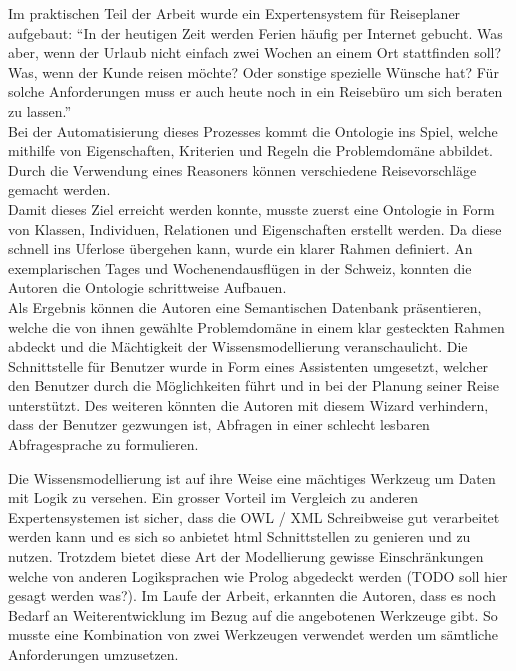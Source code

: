 Im praktischen Teil der Arbeit wurde ein Expertensystem für Reiseplaner aufgebaut: "`In der heutigen Zeit werden Ferien häufig per Internet gebucht. Was aber, wenn der Urlaub nicht einfach zwei Wochen an einem Ort stattfinden soll? Was, wenn der Kunde reisen möchte? Oder sonstige spezielle Wünsche hat? Für solche Anforderungen muss er auch heute noch in ein Reisebüro um sich beraten zu lassen."'\\
Bei der Automatisierung dieses Prozesses kommt die Ontologie ins Spiel, welche mithilfe von Eigenschaften, Kriterien und Regeln die Problemdomäne abbildet. Durch die Verwendung eines Reasoners können verschiedene Reisevorschläge gemacht werden.\\
Damit dieses Ziel erreicht werden konnte, musste zuerst eine Ontologie in Form von Klassen, Individuen, Relationen und Eigenschaften erstellt werden. Da diese schnell ins Uferlose übergehen kann, wurde ein klarer Rahmen definiert. An exemplarischen Tages und Wochenendausflügen in der Schweiz, konnten die Autoren die Ontologie schrittweise Aufbauen. \\
Als Ergebnis können die Autoren eine Semantischen Datenbank präsentieren, welche die von ihnen gewählte Problemdomäne in einem klar gesteckten Rahmen abdeckt und die Mächtigkeit der Wissensmodellierung veranschaulicht. Die Schnittstelle für Benutzer wurde in Form eines Assistenten umgesetzt, welcher den Benutzer durch die Möglichkeiten führt und in bei der Planung seiner Reise unterstützt. Des weiteren könnten die Autoren mit diesem Wizard verhindern, dass der Benutzer gezwungen ist, Abfragen in einer schlecht lesbaren Abfragesprache zu formulieren. 

Die Wissensmodellierung ist auf ihre Weise eine mächtiges Werkzeug um Daten mit Logik zu versehen. Ein grosser Vorteil im Vergleich zu anderen Expertensystemen ist sicher, dass die OWL / XML Schreibweise gut verarbeitet werden kann und es sich so anbietet html Schnittstellen zu genieren und zu nutzen. Trotzdem bietet diese Art der Modellierung gewisse Einschränkungen welche von anderen Logiksprachen wie Prolog abgedeckt werden (TODO soll hier gesagt werden was?). Im Laufe der Arbeit, erkannten die Autoren, dass es noch Bedarf an Weiterentwicklung im Bezug auf die angebotenen Werkzeuge gibt. So musste eine Kombination von zwei Werkzeugen verwendet werden um sämtliche Anforderungen umzusetzen.




